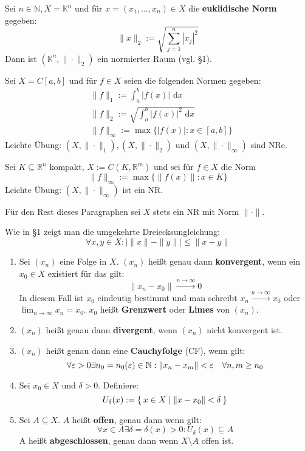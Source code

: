 \documentclass[a4paper,oneside,DIV15,BCOR12mm,chapterprefix=true,headings=onelinechapter]{scrbook}
\begin{document}
\begin{beispiele}
\item Sei $n\in\mathbb{N},X=\mathbb{K}^n$ und für $x=(x_1,\ldots,x_n)\in X$
die \textbf{euklidische Norm} gegeben:
\[\|x\|_2:=\sqrt{\sum_{j=1}^n |x_j|^2}\]
Dann ist $(\mathbb{K}^n,\|\cdot\|_2)$ ein normierter Raum (vgl. §1).
\item Sei $X=C[a,b]$ und für $f\in X$ seien die folgenden Normen gegeben:
\begin{align*}
&\|f\|_1:=\int_a^b|f(x)|\text{ d}x\\
&\|f\|_2:=\sqrt{\int_a^b|f(x)|^2\text{ d}x}\\
&\|f\|_\infty:=\max\{|f(x)|:x\in[a,b]\}
\end{align*}
Leichte Übung: $(X,\|\cdot\|_1),(X,\|\cdot\|_2)$ und $(X,\|\cdot\|_\infty)$
sind NRe.
\item Sei $K\subseteq \mathbb{R}^n$ kompakt, $X:=C(K,\mathbb{R}^m)$ und sei für
$f\in X$ die Norm
\[\|f\|_\infty:=\max\{\|f(x)\|:x\in K\}\]
Leichte Übung: $(X,\|\cdot\|_\infty)$ ist ein NR.
\end{beispiele}

Für den Rest dieses Paragraphen sei $X$ stets ein NR mit Norm $\|\cdot\|$.

\begin{bemerkung}
Wie in §1 zeigt man die umgekehrte Dreiecksungleichung:
\[\forall x,y\in X:|\|x\|-\|y\||\le\|x-y\|\]
\end{bemerkung}

\begin{definition}
\begin{enumerate}
\item Sei $(x_n)$ eine Folge in $X$. $(x_n)$ heißt genau dann \textbf{konvergent},
wenn ein $x_0\in X$ existiert für das gilt:
\[\|x_n-x_0\|\stackrel{n\to\infty}\to 0\]
In diesem Fall ist $x_0$ eindeutig bestimmt und man schreibt $x_n\stackrel{n\to\infty}\to x_0$
oder $\lim_{n\to\infty} x_n=x_0$. $x_0$ heißt \textbf{Grenzwert} oder \textbf{Limes}
von $(x_n)$.
\item $(x_n)$ heißt genau dann \textbf{divergent}, wenn $(x_n)$ nicht konvergent ist.
\item $(x_n)$ heißt genau dann eine \textbf{Cauchyfolge} (CF), wenn gilt:
\[\forall\varepsilon>0 \exists n_0=n_0(\varepsilon)\in\mathbb{N}:\|x_n-x_m\|<\varepsilon\quad \forall n,m\ge n_0\]
\item Sei $x_0\in X$ und $\delta>0$. Definiere:
\[U_\delta(x):=\Set{x\in X | \|x-x_0\|<\delta}\]
\item Sei $A\subseteq X$. $A$ heißt \textbf{offen}, genau dann wenn gilt:
\[\forall x\in A\exists \delta=\delta(x)>0: U_\delta(x)\subseteq A\]
A heißt \textbf{abgeschlossen}, genau dann wenn $X\setminus A$ offen ist.
\end{enumerate}
\end{definition}
\end{document}
